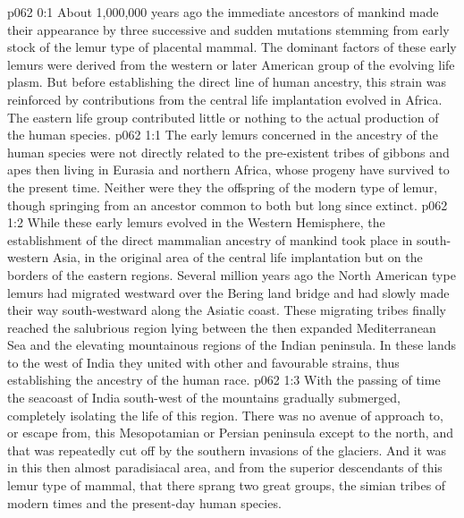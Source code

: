 \author{Life Carrier}
\vs p062 0:1 About 1,000,000 years ago the immediate ancestors of mankind made their appearance by three successive and sudden mutations stemming from early stock of the lemur type of placental mammal. The dominant factors of these early lemurs were derived from the western or later American group of the evolving life plasm. But before establishing the direct line of human ancestry, this strain was reinforced by contributions from the central life implantation evolved in Africa. The eastern life group contributed little or nothing to the actual production of the human species.
\vs p062 1:1 The early lemurs concerned in the ancestry of the human species were not directly related to the pre\hyp{}existent tribes of gibbons and apes then living in Eurasia and northern Africa, whose progeny have survived to the present time. Neither were they the offspring of the modern type of lemur, though springing from an ancestor common to both but long since extinct.
\vs p062 1:2 While these early lemurs evolved in the Western Hemisphere, the establishment of the direct mammalian ancestry of mankind took place in south\hyp{}western Asia, in the original area of the central life implantation but on the borders of the eastern regions. Several million years ago the North American type lemurs had migrated westward over the Bering land bridge and had slowly made their way south\hyp{}westward along the Asiatic coast. These migrating tribes finally reached the salubrious region lying between the then expanded Mediterranean Sea and the elevating mountainous regions of the Indian peninsula. In these lands to the west of India they united with other and favourable strains, thus establishing the ancestry of the human race.
\vs p062 1:3 With the passing of time the seacoast of India south\hyp{}west of the mountains gradually submerged, completely isolating the life of this region. There was no avenue of approach to, or escape from, this Mesopotamian or Persian peninsula except to the north, and that was repeatedly cut off by the southern invasions of the glaciers. And it was in this then almost paradisiacal area, and from the superior descendants of this lemur type of mammal, that there sprang two great groups, the simian tribes of modern times and the present\hyp{}day human species.
